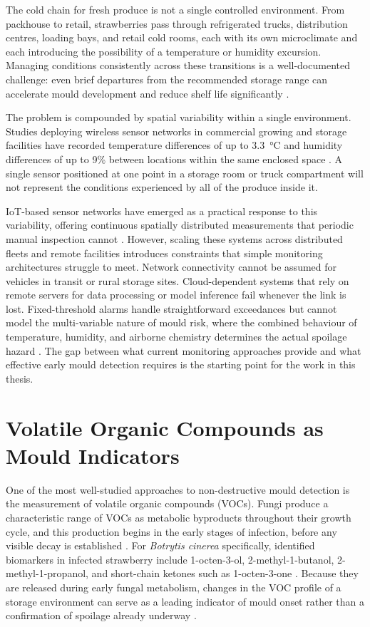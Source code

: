 The cold chain for fresh produce is not a single controlled environment. From packhouse to retail, strawberries pass through refrigerated trucks, distribution centres, loading bays, and retail cold rooms, each with its own microclimate and each introducing the possibility of a temperature or humidity excursion. Managing conditions consistently across these transitions is a well-documented challenge: even brief departures from the recommended storage range can accelerate mould development and reduce shelf life significantly \cite{Mercier2017}.

The problem is compounded by spatial variability within a single environment. Studies deploying wireless sensor networks in commercial growing and storage facilities have recorded temperature differences of up to \SI{3.3}{\celsius} and humidity differences of up to 9\% between locations within the same enclosed space \cite{Ferentinos2017}. A single sensor positioned at one point in a storage room or truck compartment will not represent the conditions experienced by all of the produce inside it.

IoT-based sensor networks have emerged as a practical response to this variability, offering continuous spatially distributed measurements that periodic manual inspection cannot \cite{Lamberty2025}. However, scaling these systems across distributed fleets and remote facilities introduces constraints that simple monitoring architectures struggle to meet. Network connectivity cannot be assumed for vehicles in transit or rural storage sites. Cloud-dependent systems that rely on remote servers for data processing or model inference fail whenever the link is lost. Fixed-threshold alarms handle straightforward exceedances but cannot model the multi-variable nature of mould risk, where the combined behaviour of temperature, humidity, and airborne chemistry determines the actual spoilage hazard \cite{Wang2024}. The gap between what current monitoring approaches provide and what effective early mould detection requires is the starting point for the work in this thesis.

\section{Volatile Organic Compounds as Mould Indicators}

One of the most well-studied approaches to non-destructive mould detection is the measurement of volatile organic compounds (VOCs). Fungi produce a characteristic range of VOCs as metabolic byproducts throughout their growth cycle, and this production begins in the early stages of infection, before any visible decay is established \cite{Yang2025}. For \textit{Botrytis cinerea} specifically, identified biomarkers in infected strawberry include 1-octen-3-ol, 2-methyl-1-butanol, 2-methyl-1-propanol, and short-chain ketones such as 1-octen-3-one \cite{Vandendriessche2012}. Because they are released during early fungal metabolism, changes in the VOC profile of a storage environment can serve as a leading indicator of mould onset rather than a confirmation of spoilage already underway \cite{Ma2023}.

